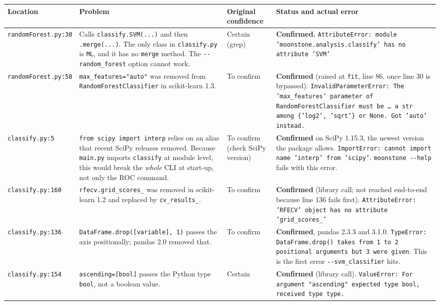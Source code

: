 \documentclass[11pt,a4paper]{article}
\newcommand{\code}[1]{\texttt{\small #1}}
\begin{document}
\begin{longtable}{@{}P{3.35cm}P{4.5cm}P{1.7cm}P{5.6cm}@{}}
\toprule
\textbf{Location} & \textbf{Problem} & \textbf{Original confidence} & \textbf{Status and actual error}\\
\midrule
\endhead
\code{randomForest.py:30} & Calls \code{classify.SVM(...)} and then \code{.merge(...)}. The only class in \code{classify.py} is \code{ML}, and it has no \code{merge} method. The \code{-{}-random\_forest} option cannot work. & Certain (grep) & \textbf{Confirmed.} \code{AttributeError: module 'moonstone.analysis.classify' has no attribute 'SVM'}\\
\code{randomForest.py:58} & \code{max\_features="auto"} was removed from \code{RandomForestClassifier} in scikit-learn 1.3. & To confirm & \textbf{Confirmed} (raised at \code{fit}, line 86, once line 30 is bypassed). \code{InvalidParameterError: The 'max\_features' parameter of RandomForestClassifier must be \ldots{} a str among \{'log2', 'sqrt'\} or None. Got 'auto' instead.}\\
\code{classify.py:5} & \code{from scipy import interp} relies on an alias that recent SciPy releases removed. Because \code{main.py} imports \code{classify} at module level, this would break the \emph{whole} CLI at start-up, not only the ROC command. & To confirm (check SciPy version) & \textbf{Confirmed} on SciPy 1.15.3, the newest version the package allows. \code{ImportError: cannot import name 'interp' from 'scipy'}. \code{moonstone -{}-help} fails with this error.\\
\code{classify.py:160} & \code{rfecv.grid\_scores\_} was removed in scikit-learn 1.2 and replaced by \code{cv\_results\_}. & To confirm & \textbf{Confirmed} (library call; not reached end-to-end because line 136 fails first). \code{AttributeError: 'RFECV' object has no attribute 'grid\_scores\_'}\\
\code{classify.py:136} & \code{DataFrame.drop([variable], 1)} passes the axis positionally; pandas 2.0 removed that. & To confirm & \textbf{Confirmed}, pandas 2.3.3 and 3.1.0. \code{TypeError: DataFrame.drop() takes from 1 to 2 positional arguments but 3 were given}. This is the first error \code{-{}-svm\_classifier} hits.\\
\code{classify.py:154} & \code{ascending=[bool]} passes the Python type \code{bool}, not a boolean value. & Certain & \textbf{Confirmed} (library call). \code{ValueError: For argument "ascending" expected type bool, received type type.}\\
\bottomrule
\end{longtable}
\end{document}

